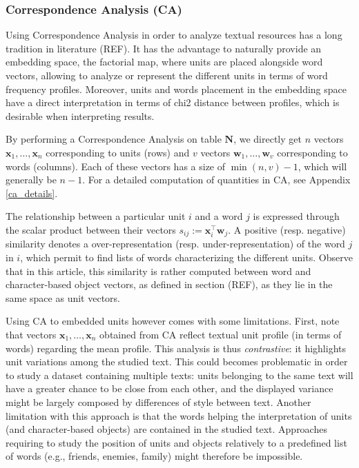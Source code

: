 \documentclass[
twocolumn,
]{ceurart}
\begin{document}
\subsubsection{Correspondence Analysis (CA)}
\label{ca_method}

Using Correspondence Analysis in order to analyze textual resources has a long tradition in literature (REF). It has the advantage to naturally provide an embedding space, the factorial map, where units are placed alongside word vectors, allowing to analyze or represent the different units in terms of word frequency profiles. Moreover, units and words placement in the embedding space have a direct interpretation in terms of chi2 distance between profiles, which is desirable when interpreting results.

By performing a Correspondence Analysis on table $\mathbf{N}$, we directly get $n$ vectors $\mathbf{x}_1, \ldots, \mathbf{x}_n$ corresponding to units (rows) and $v$ vectors $\mathbf{w}_1, \ldots, \mathbf{w}_v$ corresponding to words (columns). Each of these vectors has a size of $\min(n, v) - 1$, which will generally be $n - 1$. For a detailed computation of quantities in CA, see Appendix \ref{ca_details}. 

The relationship between a particular unit $i$ and a word $j$ is expressed through the scalar product between their vectors $s_{ij} := \mathbf{x}^\top_i \mathbf{w}_j$. A positive (resp. negative) similarity denotes a over-representation (resp. under-representation) of the word $j$ in $i$, which permit to find lists of words characterizing the different units. Observe that in this article, this similarity is rather computed between word and character-based object vectors, as defined in section (REF), as they lie in the same space as unit vectors. 

Using CA to embedded units however comes with some limitations. First, note that vectors $\mathbf{x}_1, \ldots, \mathbf{x}_n$ obtained from CA reflect textual unit profile (in terms of words) regarding the mean profile. This analysis is thus \emph{contrastive}: it highlights unit variations among the studied text. This could becomes problematic in order to study a dataset containing multiple texts: units belonging to the same text will have a greater chance to be close from each other, and the displayed variance might be largely composed by differences of style between text. Another limitation with this approach is that the words helping the interpretation of units (and character-based objects) are contained in the studied text. Approaches requiring to study the position of units and objects relatively to a predefined list of words (e.g., friends, enemies, family) might therefore be impossible.
\end{document}

